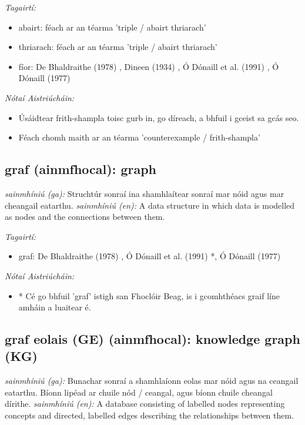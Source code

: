 \documentclass{article}
\begin{document}
 \noindent \textit{Tagairtí:}
\begin{itemize}
	\item abairt: féach ar an téarma 'triple / abairt thriarach'
	\item thriarach: féach ar an téarma 'triple / abairt thriarach'
	\item fíor: De Bhaldraithe (1978) \cite{de-bhaldraithe}, Dineen (1934) \cite{dineen}, Ó Dónaill et al. (1991) \cite{focloir-beag}, Ó Dónaill (1977) \cite{odonaill}
\end{itemize}

 \noindent \textit{Nótaí Aistriúcháin:}
\begin{itemize}
	\item Úsáidtear frith-shampla toisc gurb in, go díreach, a bhfuil i gceist sa gcás seo.
	\item Féach chomh maith ar an téarma 'counterexample / frith-shampla'
\end{itemize}


\subsection*{graf (ainmfhocal): graph} 
 \noindent \textit{sainmhíniú (ga):} Struchtúr sonraí ina shamhlaítear sonraí mar nóid agus mar cheangail eatarthu.
\newline\newline
 \noindent \textit{sainmhíniú (en):} A data structure in which data is modelled as nodes and the connections between them.
\newline

 \noindent \textit{Tagairtí:}
\begin{itemize}
	\item graf: De Bhaldraithe (1978) \cite{de-bhaldraithe}, Ó Dónaill et al. (1991) \cite{focloir-beag}*, Ó Dónaill (1977) \cite{odonaill}
\end{itemize}

 \noindent \textit{Nótaí Aistriúcháin:}
\begin{itemize}
	\item * Cé go bhfuil 'graf' istigh san Fhoclóir Beag, is i gcomhthéacs graif líne amháin a luaitear é.
\end{itemize}


\subsection*{graf eolais (GE) (ainmfhocal): knowledge graph (KG)} 
 \noindent \textit{sainmhíniú (ga):} Bunachar sonraí a shamhlaíonn eolas mar nóid agus na ceangail eatarthu. Bíonn lipéad ar chuile nód / ceangal, agus bíonn chuile cheangal dírithe.
\newline\newline
 \noindent \textit{sainmhíniú (en):} A database consisting of labelled nodes representing concepts and directed, labelled edges describing the relationships between them.
\newline
\end{document}
